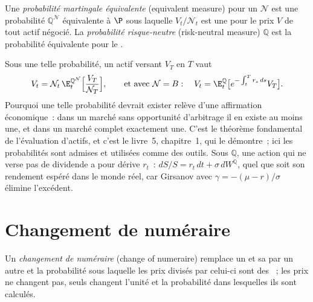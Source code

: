 \begin{definition}\label{def:qm:girsanov-and-changes-of-numeraire:emm}
Une \emph{probabilité martingale équivalente} (equivalent  measure) pour un  $\mathcal N$
est une probabilité $\mathbb Q^{\mathcal N}$ équivalente à $\P$ sous laquelle $V_t/\mathcal N_t$ est une  pour
le prix $V$ de tout actif négocié. La \emph{probabilité risque-neutre} (risk-neutral measure)
$\mathbb Q$ est la probabilité  équivalente pour le .
\end{definition}

Sous une telle probabilité, un actif versant $V_T$ en $T$ vaut
\[
V_t = \mathcal N_t\,\E^{\mathbb Q^{\mathcal N}}_t\Bigl[\frac{V_T}{\mathcal N_T}\Bigr], \qquad\text{et avec } \mathcal N = B:\quad V_t =
\E^{\mathbb Q}_t\bigl[e^{-\int_t^Tr_s\,ds}V_T\bigr].
\]
Pourquoi une telle probabilité devrait exister relève d'une affirmation économique~: dans un marché sans opportunité d'arbitrage
il en existe au moins une, et dans un marché complet exactement une. C'est le théorème fondamental de
l'évaluation d'actifs, et c'est le livre~5, chapitre~1, qui le démontre~; ici les probabilités sont admises
et utilisées comme des outils. Sous $\mathbb Q$, une action qui ne verse pas de dividende a pour dérive $r_t$~: $dS/S = r_t\,dt +
\sigma\,dW^{\mathbb Q}$, quel que soit son rendement espéré dans le monde réel, car Girsanov avec $\gamma = -(\mu -
r)/\sigma$ élimine l'excédent.

\section{Changement de numéraire}

\begin{definition}\label{def:qm:girsanov-and-changes-of-numeraire:changenum}
Un \emph{changement de numéraire} (change of numeraire) remplace un  et sa  par un autre  et la probabilité sous laquelle les prix divisés par celui-ci sont des
~; les prix ne changent pas, seuls changent l'unité et la probabilité dans lesquelles ils sont calculés.
\end{definition}

